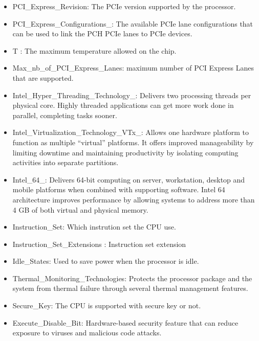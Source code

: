 \begin{itemize}
    \item PCI\_Express\_Revision: The PCIe version supported by the processor. 
    \item PCI\_Express\_Configurations\_: The available PCIe lane configurations that can be used to link the PCH PCIe lanes to PCIe devices.
    \item T : The maximum temperature allowed on the chip.
    \item Max\_nb\_of\_PCI\_Express\_Lanes: maximum number of PCI Express Lanes that are supported.
    \item Intel\_Hyper\_Threading\_Technology\_: Delivers two processing threads per physical core. Highly threaded applications can get more work done in parallel, completing tasks sooner.
    \item Intel\_Virtualization\_Technology\_VTx\_: Allows one hardware platform to function as multiple “virtual” platforms. It offers improved manageability by limiting downtime and maintaining productivity by isolating computing activities into separate partitions.
    \item Intel\_64\_: Delivers 64-bit computing on server, workstation, desktop and mobile platforms when combined with supporting software. Intel 64 architecture improves performance by allowing systems to address more than 4 GB of both virtual and physical memory.
    \item Instruction\_Set: Which instrution set the CPU use.
    \item Instruction\_Set\_Extensions :  Instruction set extension
    \item Idle\_States: Used to save power when the processor is idle.
    \item Thermal\_Monitoring\_Technologies: Protects the processor package and the system from thermal failure through several thermal management features.	
    \item Secure\_Key: The CPU is supported with secure key or not.
    \item Execute\_Disable\_Bit: Hardware-based security feature that can reduce exposure to viruses and malicious code attacks.
\end{itemize}

